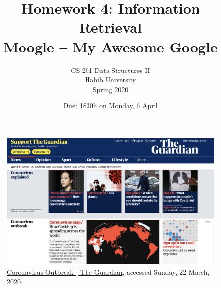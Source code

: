 \documentclass[addpoints]{exam}
\title{Homework 4: Information Retrieval\\Moogle -- My Awesome Google}
\author{CS 201 Data Structures II\\Habib University\\Spring 2020}
\date{Due: 1830h on Monday, 6 April}
\begin{document}
\maketitle

\begin{figure}[h]
  \centering
  \includegraphics[width=.9\textwidth]{guardian}
  \caption{\href{https://www.theguardian.com/world/coronavirus-outbreak}{Coronavirus Outbreak $|$ The Guardian}, accessed Sunday, 22 March, 2020.}
  \label{fig:guardian}
\end{figure}
\end{document}
